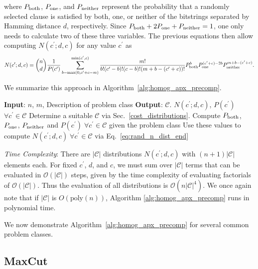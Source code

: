 \documentclass[superscriptaddress,pra,aps,10pt,longbibliography,notitlepage]{revtex4-1}
\newcommand{\Prob}[1]{\ensuremath{P_{\textnormal{#1}}}}
\newcommand{\Pboth}{\Prob{both}}
\newcommand{\Pone}{\Prob{one}}
\newcommand{\Pneither}{\Prob{neither}}
\newcommand*\cp{c^\prime}
\begin{document}
where $\Pboth$, $\Pone$, and $\Pneither$ represent the probability that a randomly selected clause is satisfied by both, one, or neither of the bitstrings separated by Hamming distance $d$, respectively. Since $\Pboth + 2\Pone + \Pneither = 1$, one only needs to calculate two of these three variables. 
The previous equations then allow computing $N(\cp;d,c)$ for any value $\cp$ as
\begin{equation}\label{eq:rand_n_dist_end}
N(\cp;d,c) = \binom{n}{d} \frac{1}{P(\cp)}\sum_{b=\max(0, \cp+c-m)}^{\min(\cp,c)} \frac{m!}{b!(\cp-b)!(c-b)!(m+b-(\cp+c))!} \Pboth^b \Pone^{(\cp+c)-2b} \Pneither^{m+b-(\cp+c)}.
\end{equation}

We summarize this approach in Algorithm~\ref{alg:homog_apx_precomp}.
\vspace{2mm}

\begin{algorithm}
\caption{Classical Homogeneous Proxy for QAOA Pre-computation for Randomly Drawn Cost Function}\label{alg:homog_apx_precomp}
\begin{algorithmic}
\STATE \textbf{Input}: $n$, $m$, Description of problem class 
\STATE \textbf{Output}: $\mathcal{C}$. $N(\cp;d,c)$, $P(\cp)$ $\forall \cp\in \mathcal{C}$
\STATE Determine a suitable $\mathcal{C}$ via Sec.~\ref{cost_distributions}.
\STATE Compute $\Pboth$, $\Pone$, $\Pneither$ and $P(\cp) \; \forall \cp\in \mathcal{C}$ given the problem class
\STATE Use these values to compute $N(\cp;d,c) \; \forall \cp\in \mathcal{C}$ via Eq.~\eqref{eq:rand_n_dist_end}
\\\hrulefill
\end{algorithmic}
\end{algorithm}

\emph{Time Complexity}: There are $|\mathcal{C}|$ distributions $N(\cp;d,c)$ with $(n+1)|\mathcal{C}|$ elements each. For fixed $\cp$, $d$, and $c$, we must sum over $|\mathcal{C}|$ terms that can be evaluated in $\mathcal{O}(|\mathcal{C}|)$ steps, given by the time complexity of evaluating factorials of  $\mathcal{O}(|\mathcal{C}|)$. Thus the evaluation of all distributions is $\mathcal{O}(n|\mathcal{C}|^4)$. We once again note that if $|\mathcal{C}|$ is $O(\mathrm{poly}(n))$, Algorithm \ref{alg:homog_apx_precomp} runs in polynomial time.

We now demonstrate Algorithm~\ref{alg:homog_apx_precomp} for several common problem classes. 


\subsection{MaxCut}\label{example_maxcut}
\end{document}
